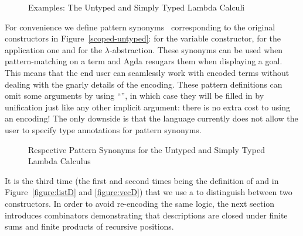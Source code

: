 \begin{figure}[h]
\begin{minipage}{0.40\textwidth}
\end{minipage}\hspace{2em}
\begin{minipage}{0.50\textwidth}
\end{minipage}
\caption{Examples: The Untyped and Simply Typed Lambda Calculi}
\end{figure}

For convenience we define pattern synonyms~\cite{Pickering:patsyn} corresponding
to the original constructors in Figure~\ref{scoped-untyped}: 
for  the variable constructor,  for  the
application one and  for  the $\lambda$-abstraction.
These synonyms can be used when pattern-matching on a term and Agda
resugars them when displaying a goal. This means that the end user
can seamlessly work with encoded terms without dealing with the gnarly
details of the encoding.
These pattern definitions can omit some arguments by using ``\AS{\_}'',
in which case they will be filled in by unification just like any other
implicit argument: there is no extra cost to using an encoding!
The only downside is that the language currently does not allow the
user to specify type annotations for pattern synonyms.

\begin{figure}[h]
\begin{minipage}{0.40\textwidth}
\end{minipage}\hspace{2em}
\begin{minipage}{0.50\textwidth}
\end{minipage}
\caption{Respective Pattern Synonyms for the Untyped and Simply Typed Lambda Calculus}
\end{figure}

It is the third time (the first and second times being the definition of
 and  in Figure~\ref{figure:listD} and \ref{figure:vecD})
that we use a  to distinguish between two constructors. In order
to avoid re-encoding the same logic,
the next section introduces combinators demonstrating that
descriptions are closed under finite sums and finite products
of recursive positions.

